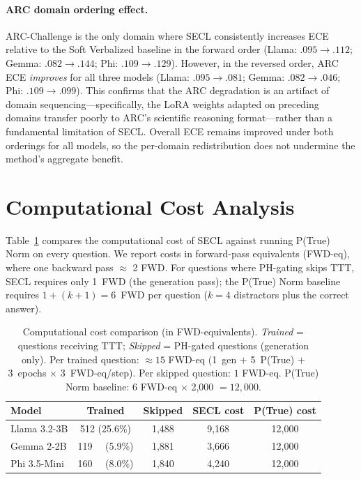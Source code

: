\paragraph{ARC domain ordering effect.}
ARC-Challenge is the only domain where SECL consistently increases ECE
relative to the Soft Verbalized baseline in the forward order
(Llama: $.095 \to .112$; Gemma: $.082 \to .144$; Phi: $.109 \to .129$).
However, in the reversed order, ARC ECE \emph{improves} for all three models
(Llama: $.095 \to .081$; Gemma: $.082 \to .046$; Phi: $.109 \to .099$).
This confirms that the ARC degradation is an artifact of domain sequencing---specifically,
the LoRA weights adapted on preceding domains transfer poorly to ARC's
scientific reasoning format---rather than a fundamental limitation of SECL.
Overall ECE remains improved under both orderings for all models,
so the per-domain redistribution does not undermine the method's aggregate benefit.


\section{Computational Cost Analysis} \label{app:cost}

Table~\ref{tab:cost} compares the computational cost of SECL against
running P(True) Norm on every question.
We report costs in forward-pass equivalents (FWD-eq), where one 
backward pass $\approx$ 2 FWD.
For questions where PH-gating skips TTT, SECL requires only 1~FWD 
(the generation pass); the P(True) Norm baseline requires $1 + (k{+}1) = 6$~FWD 
per question ($k{=}4$ distractors plus the correct answer).

\begin{table}[h]
\centering
\caption{Computational cost comparison (in FWD-equivalents).
\emph{Trained} = questions receiving TTT;
\emph{Skipped} = PH-gated questions (generation only).
Per trained question: ${\approx}15$ FWD-eq 
(1~gen $+$ 5~P(True) $+$ 3~epochs $\times$ 3~FWD-eq/step).
Per skipped question: $1$ FWD-eq.
P(True) Norm baseline: 6 FWD-eq $\times$ 2{,}000 $= 12{,}000$.}
\label{tab:cost}
\small
\begin{tabular}{@{}lcccc@{}}
\toprule
\textbf{Model} & \textbf{Trained} & \textbf{Skipped}
  & \textbf{SECL cost} & \textbf{P(True) cost} \\
\midrule
Llama 3.2-3B & 512 (25.6\%) & 1{,}488 & 9{,}168 & 12{,}000 \\
Gemma 2-2B   & 119 ~~(5.9\%) & 1{,}881 & 3{,}666 & 12{,}000 \\
Phi 3.5-Mini & 160 ~~(8.0\%) & 1{,}840 & 4{,}240 & 12{,}000 \\
\bottomrule
\end{tabular}
\end{table}

